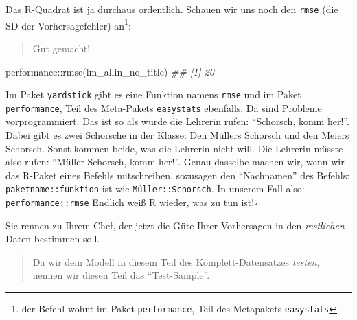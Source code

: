\documentclass[
  letterpaper,
]{scrbook}
\newenvironment{Shaded}{\begin{snugshade}}{\end{snugshade}}
\newcommand{\DocumentationTok}[1]{\textcolor[rgb]{0.37,0.37,0.37}{\textit{#1}}}
\newcommand{\FunctionTok}[1]{\textcolor[rgb]{0.28,0.35,0.67}{#1}}
\newcommand{\NormalTok}[1]{\textcolor[rgb]{0.00,0.23,0.31}{#1}}
\newcommand{\SpecialCharTok}[1]{\textcolor[rgb]{0.37,0.37,0.37}{#1}}
\theoremstyle{definition}
\theoremstyle{definition}
\theoremstyle{definition}
\theoremstyle{remark}
\begin{document}
Das R-Quadrat ist ja durchaus ordentlich. Schauen wir uns noch den
\texttt{rmse} (die SD der Vorhersagefehler) an\footnote{der Befehl wohnt
  im Paket \texttt{performance}, Teil des Metapakets \texttt{easystats}}:

\begin{quote}
{} Gut gemacht!
\end{quote}

\begin{Shaded}
\begin{Highlighting}[]
\NormalTok{performance}\SpecialCharTok{::}\FunctionTok{rmse}\NormalTok{(lm\_allin\_no\_title)}
\DocumentationTok{\#\# [1] 20}
\end{Highlighting}
\end{Shaded}

\begin{tcolorbox}[enhanced jigsaw, colbacktitle=quarto-callout-caution-color!10!white, coltitle=black, bottomrule=.15mm, rightrule=.15mm, arc=.35mm, toptitle=1mm, colframe=quarto-callout-caution-color-frame, opacitybacktitle=0.6, left=2mm, leftrule=.75mm, breakable, opacityback=0, bottomtitle=1mm, titlerule=0mm, title=\textcolor{quarto-callout-caution-color}{\faFire}\hspace{0.5em}{Name Clash}, colback=white, toprule=.15mm]

Im Paket \texttt{yardstick} gibt es eine Funktion namens \texttt{rmse}
und im Paket \texttt{performance}, Teil des Meta-Pakets
\texttt{easystats} ebenfalls. Da sind Probleme vorprogrammiert. Das ist
so als würde die Lehrerin rufen: ``Schorsch, komm her!''. Dabei gibt es
zwei Schorsche in der Klasse: Den Müllers Schorsch und den Meiers
Schorsch. Sonst kommen beide, was die Lehrerin nicht will. Die Lehrerin
müsste also rufen: ``Müller Schorsch, komm her!''. Genau dasselbe machen
wir, wenn wir das R-Paket eines Befehls mitschreiben, sozusagen den
``Nachnamen'' des Befehls: \texttt{paketname::funktion} ist wie
\texttt{Müller::Schorsch}. In unserem Fall also:
\texttt{performance::rmse} Endlich weiß R wieder, was zu tun
ist!\(\square\)

\end{tcolorbox}

Sie rennen zu Ihrem Chef, der jetzt die Güte Ihrer Vorhersagen in den
\emph{restlichen} Daten bestimmen soll.

\begin{quote}
{} Da wir dein Modell in diesem Teil des
Komplett-Datensatzes \emph{testen}, nennen wir diesen Teil das
``Test-Sample''.
\end{quote}
\end{document}

